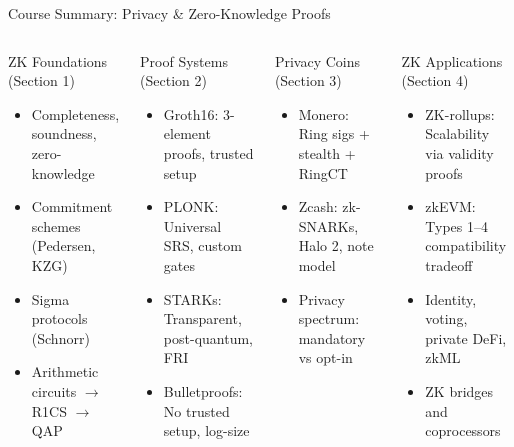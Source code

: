 \documentclass[8pt,aspectratio=169]{beamer}
\begin{document}
\begin{frame}{Course Summary: Privacy \& Zero-Knowledge Proofs}
\begin{columns}[T]
\begin{block}{\footnotesize ZK Foundations (Section 1)}
\footnotesize
\begin{itemize}
\item Completeness, soundness, zero-knowledge
\item Commitment schemes (Pedersen, KZG)
\item Sigma protocols (Schnorr)
\item Arithmetic circuits $\to$ R1CS $\to$ QAP
\end{itemize}
\end{block}
\vspace{0.1cm}
\begin{block}{\footnotesize Proof Systems (Section 2)}
\footnotesize
\begin{itemize}
\item Groth16: 3-element proofs, trusted setup
\item PLONK: Universal SRS, custom gates
\item STARKs: Transparent, post-quantum, FRI
\item Bulletproofs: No trusted setup, log-size
\end{itemize}
\end{block}
\vspace{0.1cm}
\begin{block}{\footnotesize Privacy Coins (Section 3)}
\footnotesize
\begin{itemize}
\item Monero: Ring sigs + stealth + RingCT
\item Zcash: zk-SNARKs, Halo 2, note model
\item Privacy spectrum: mandatory vs opt-in
\end{itemize}
\end{block}
\begin{block}{\footnotesize ZK Applications (Section 4)}
\footnotesize
\begin{itemize}
\item ZK-rollups: Scalability via validity proofs
\item zkEVM: Types 1--4 compatibility tradeoff
\item Identity, voting, private DeFi, zkML
\item ZK bridges and coprocessors
\end{itemize}

\end{block}
\end{columns}
\end{frame}
\end{document}
